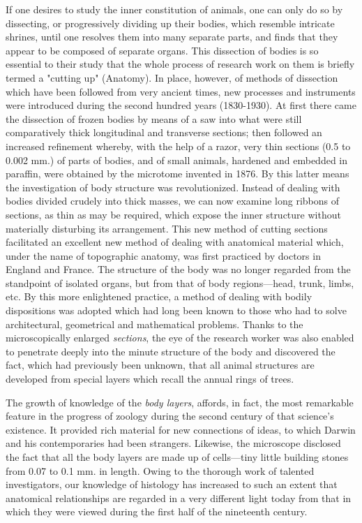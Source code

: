 If one desires to study the inner constitution of animals, one can only do so by dissecting, or
progressively dividing up their bodies, which resemble intricate shrines, until one resolves
them into many separate parts, and finds that they appear to be composed of separate organs.
This dissection of bodies is so essential to their study that the whole process of research work
on them is briefly termed a "cutting up" (Anatomy). In place, however, of methods of
dissection which have been followed from very ancient times, new processes and instruments
were introduced during the second hundred years (1830-1930). At first there came the
dissection of frozen bodies by means of a saw into what were still comparatively thick
longitudinal and transverse sections; then followed an increased refinement whereby, with
the help of a razor, very thin sections (0.5 to 0.002 mm.) of parts of bodies, and of small
animals, hardened and embedded in paraffin, were obtained by the microtome invented in
1876. By this latter means the investigation of body structure was revolutionized. Instead of
dealing with bodies divided crudely into thick masses, we can now examine long ribbons of
sections, as thin as may be required, which expose the inner structure without materially
disturbing its arrangement. This new method of cutting sections facilitated an excellent new
method of dealing with anatomical material which, under the name of topographic anatomy,
was first practiced by doctors in England and France. The structure of the body was no
longer regarded from the standpoint of isolated organs, but from that of body regions—head,
trunk, limbs, etc. By this more enlightened practice, a method of dealing with bodily
dispositions was adopted which had long been known to those who had to solve architectural,
geometrical and mathematical problems. Thanks to the microscopically enlarged \textit{sections}, the
eye of the research worker was also enabled to penetrate deeply into the minute structure of
the body and discovered the fact, which had previously been unknown, that all animal
structures are developed from special layers which recall the annual rings of trees.

The growth of knowledge of the \textit{body layers}, affords, in fact, the most remarkable feature in
the progress of zoology during the second century of that science's existence. It provided rich
material for new connections of ideas, to which Darwin and his contemporaries had been
strangers. Likewise, the microscope disclosed the fact that all the body layers are made up of
cells—tiny little building stones from 0.07 to 0.1 mm. in length. Owing to the thorough work
of talented investigators, our knowledge of histology has increased to such an extent that
anatomical relationships are regarded in a very different light today from that in which they
were viewed during the first half of the nineteenth century.


